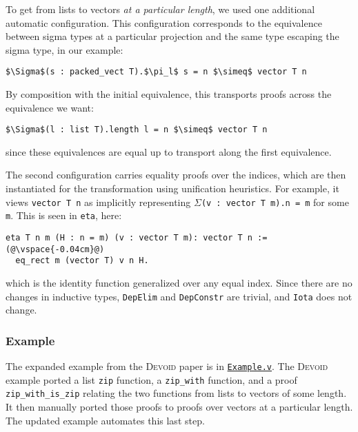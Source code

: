 To get from lists to vectors \textit{at a particular length}, we used one additional automatic configuration.
This configuration corresponds to the equivalence between sigma types at a particular projection
and the same type escaping the sigma type, in our example:

\begin{lstlisting}
$\Sigma$(s : packed_vect T).$\pi_l$ s = n $\simeq$ vector T n
\end{lstlisting}
By composition with the initial equivalence, this transports proofs
across the equivalence we want:

\begin{lstlisting}
$\Sigma$(l : list T).length l = n $\simeq$ vector T n
\end{lstlisting}
since these equivalences are equal up to transport along the first equivalence.

The second configuration carries equality proofs over the indices,
which are then instantiated for the transformation using unification heuristics.
For example, it views \lstinline{vector T n} as implicitly representing $\Sigma$\lstinline{(v : vector T m).n = m} for some \lstinline{m}.
This is seen in \lstinline{eta}, here: 

\begin{lstlisting}[backgroundcolor=\color{cyan!30}]
eta T n m (H : n = m) (v : vector T m): vector T n :=(@\vspace{-0.04cm}@)
  eq_rect m (vector T) v n H.
\end{lstlisting}
which is the identity function generalized over any equal index.
Since there are no changes in inductive types, \lstinline{DepElim} and \lstinline{DepConstr} are trivial,
and \lstinline{Iota} does not change.


\subsubsection{Example}

The expanded example from the \textsc{Devoid} paper is in \href{https://github.com/uwplse/pumpkin-pi/blob/v2.0.0/plugin/coq/examples/Example.v}{\lstinline{Example.v}}.
The \textsc{Devoid} example ported a list \lstinline{zip} function,
a \lstinline{zip_with} function, and a proof \lstinline{zip_with_is_zip} relating the two
functions from lists to vectors of some length.
It then manually ported those proofs to proofs over vectors at a particular length.
The updated \toolname example automates this last step.

